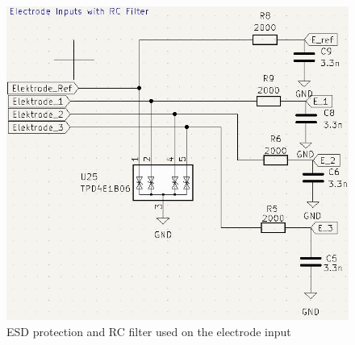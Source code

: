 \begin{figure} [H]
\begin{center}
\includegraphics[scale=0.60]{images/Inputcirc.jpg}
   \caption{ESD protection and RC filter used on the electrode input}
    \label{fig:Elecinput}
\end{center}
\end{figure}

